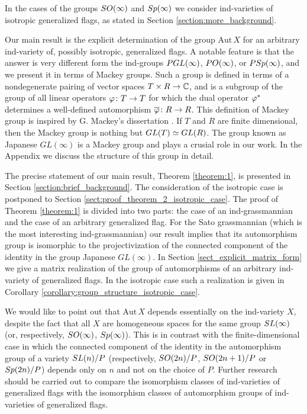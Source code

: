 \documentclass[11pt, a4paper]{article}
\begin{document}
In the cases of the groups $SO(\infty)$ and $Sp(\infty)$ we consider ind-varieties of isotropic generalized flags, as stated in Section \ref{section:more_background}.

Our main result is the explicit determination of the group $\mathrm{Aut}\,X$ for an arbitrary ind-variety of, possibly isotropic, generalized flags. A notable feature is that the answer is very different form the ind-groups $P GL(\infty)$, $P O(\infty)$, or $P Sp(\infty)$, and we present it in terms of Mackey groups. Such a group is defined in terms
of a nondegenerate pairing of vector spaces $T\times R\rightarrow \mathbb{C}$, and is a subgroup of the group of all linear operators $\varphi \colon T\rightarrow T$ for which the dual operator $\varphi^*$ determines a well-defined automorphism $\overline{\varphi}\colon R\rightarrow R$. This definition of Mackey group is inspired by G. Mackey's dissertation \cite{Mackey45}. If $T$ and $R$ are finite dimensional, then the Mackey group is nothing but $GL(T)\simeq GL(R)$. The group known as Japanese $GL(\infty)$ is a Mackey group and plays a crusial role in our work. In the Appendix we discuss the structure of this group in detail.

The precise statement of our main result, Theorem \ref{theorem:1}, is presented in Section \ref{section:brief_background}. The consideration of the isotropic case is postponed to Section \ref{sect:proof_theorem_2_isotropic_case}. The proof of Theorem \ref{theorem:1} is divided into two parts: the case of an ind-grassmannian and the case of an arbitrary generalized flag. For the Sato grassmannian (which is the most interesting ind-grassmannian) our result implies that its automorphism group is isomorphic to the projectivization of the connected component of the identity in the group Japanese $GL(\infty)$. In Section \ref{sect_explicit_matrix_form} we give a matrix realization of the group of automorphisms of an arbitrary ind-variety of generalized flags. In the isotropic case such a realization is given in Corollary \ref{corollary:group_structure_isotropic_case}.


We would like to point out that $\mathrm{Aut}\, X$ depends essentially on the ind-variety $X$, despite the fact that all $X$ are homogeneous spaces for the same group $SL(\infty)$ (or, respectively, $SO(\infty)$, $Sp(\infty)$). This is in contrast with the finite-dimensional case in which the connected component of the identity in the automorphism group of a variety $SL(n)/P$ (respectively, $SO(2n)/P$, $SO(2n+1)/P$ or $Sp(2n)/P$) depends only on $n$ and not on the choice of $P$. Further research should be carried out to compare the isomorphism classes of ind-varieties of generalized flags with the isomorphism classes of automorphism groups of ind-varieties of generalized flags.
\end{document}
